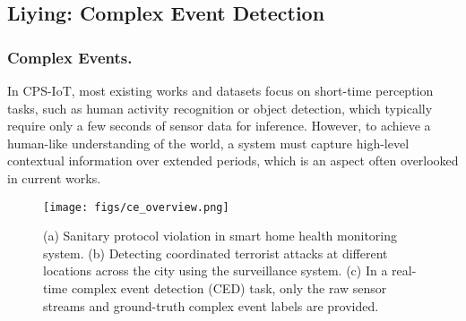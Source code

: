 \subsection{Liying: Complex Event Detection} 
\subsubsection{Complex Events.} In CPS-IoT, most existing works and datasets focus on short-time perception tasks, such as human activity recognition or object detection, which typically require only a few seconds of sensor data for inference. However, to achieve a human-like understanding of the world, a system must capture high-level contextual information over extended periods, which is an aspect often overlooked in current works. 

\begin{figure*}[t]
    \centering
\texttt{[image: figs/ce\_overview.png]}
    \caption{(a) Sanitary protocol violation in smart home health monitoring system. (b) Detecting coordinated terrorist attacks at different locations across the city using the surveillance system. (c) In a real-time complex event detection (CED) task, only the raw sensor streams and ground-truth complex event labels are provided.}
    \label{fig:ce_overview}
\end{figure*}

